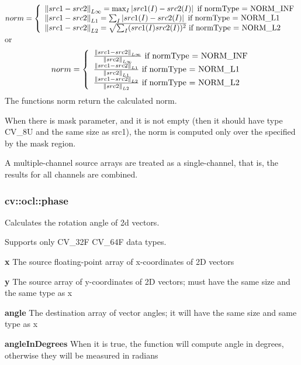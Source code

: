 \documentclass{article}
\begin{document}
$norm=\left\{ {{\begin{array}{*{20}c}
 {\left\| {src1-src2} \right\|_{L\infty } =\max _I \left| {src1(I)-src2(I)}
\right|\mbox{ if normType = NORM\_INF}} \hfill \\
 {\left\| {src1-src2} \right\|_{L1} =\sum _I \left| {src1(I)-src2(I)}
\right|\mbox{ if normType = NORM\_L1}} \hfill \\
 {\left\| {src1-src2} \right\|_{L2} =\sqrt {\sum _I (src1(I)src2(I))^2}
\mbox{ if normType = NORM\_L2}} \hfill \\
\end{array} }} \right.$ or
\[
norm=\left\{ {{\begin{array}{*{20}c}
 {\frac{\left\| {src1-src2} \right\|_{L\infty } }{\left\| {src2}
\right\|_{L\infty } }\mbox{ if normType = NORM\_INF}} \hfill \\
 {\frac{\left\| {src1-src2} \right\|_{L1} }{\left\| {src2} \right\|_{L1}
}\mbox{ if normType = NORM\_L1}} \hfill \\
 {\frac{\left\| {src1-src2} \right\|_{L2} }{\left\| {src2} \right\|_{L2}
}\mbox{ if normType = NORM\_L2}} \hfill \\
\end{array} }} \right.
\]
The functions norm return the calculated norm.

When there is mask parameter, and it is not empty (then it should have type
CV{\_}8U and the same size as src1), the norm is computed only over the
specified by the mask region.

A multiple-channel source arrays are treated as a single-channel, that is,
the results for all channels are combined.

\newpage

\subsubsection{cv::ocl::phase }
\label{subsubsec:mylabel25}
Calculates the rotation angle of 2d vectors.

Supports only CV{\_}32F CV{\_}64F data types.

\textbf{x }The source floating-point array of x-coordinates of 2D vectors

\textbf{y }The source array of y-coordinates of 2D vectors; must have the
same size and the same type as x

\textbf{angle }The destination array of vector angles; it will have the same
size and same type as x

\textbf{angleInDegrees }When it is true, the function will compute angle in
degrees, otherwise they will be measured in radians
\end{document}
